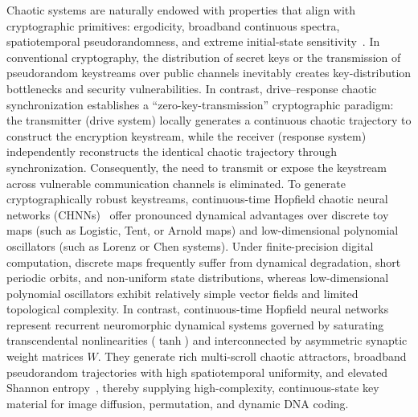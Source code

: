 \documentclass[a4paper,fleqn]{cas-dc}
\theoremstyle{plain}
\theoremstyle{definition}
\begin{document}
Chaotic systems are naturally endowed with properties that align with cryptographic primitives: ergodicity, broadband continuous spectra, spatiotemporal pseudorandomness, and extreme initial-state sensitivity~\cite{zia2022survey}. In conventional cryptography, the distribution of secret keys or the transmission of pseudorandom keystreams over public channels inevitably creates key-distribution bottlenecks and security vulnerabilities. In contrast, drive--response chaotic synchronization establishes a ``zero-key-transmission'' cryptographic paradigm: the transmitter (drive system) locally generates a continuous chaotic trajectory to construct the encryption keystream, while the receiver (response system) independently reconstructs the identical chaotic trajectory through synchronization. Consequently, the need to transmit or expose the keystream across vulnerable communication channels is eliminated. To generate cryptographically robust keystreams, continuous-time Hopfield chaotic neural networks (CHNNs)~\cite{hopfield1984neurons,LI2013a} offer pronounced dynamical advantages over discrete toy maps (such as Logistic, Tent, or Arnold maps) and low-dimensional polynomial oscillators (such as Lorenz or Chen systems). Under finite-precision digital computation, discrete maps frequently suffer from dynamical degradation, short periodic orbits, and non-uniform state distributions, whereas low-dimensional polynomial oscillators exhibit relatively simple vector fields and limited topological complexity. In contrast, continuous-time Hopfield neural networks represent recurrent neuromorphic dynamical systems governed by saturating transcendental nonlinearities ($\tanh$) and interconnected by asymmetric synaptic weight matrices $W$. They generate rich multi-scroll chaotic attractors, broadband pseudorandom trajectories with high spatiotemporal uniformity, and elevated Shannon entropy~\cite{zheng2010double,bao2017numerical,mahmoud2021analysis}, thereby supplying high-complexity, continuous-state key material for image diffusion, permutation, and dynamic DNA coding.
\end{document}
